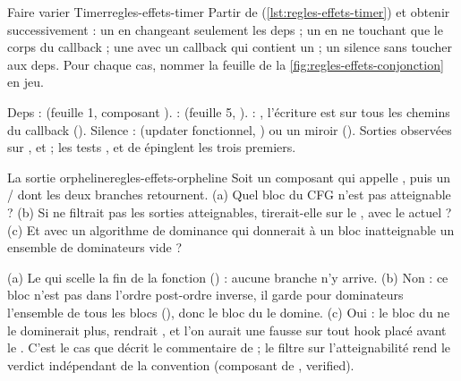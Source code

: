 \begin{exercice}{Faire varier Timer}{regles-effets-timer}
Partir de  (\cref{lst:regles-effets-timer}) et obtenir successivement : un \Warning{} en changeant seulement les deps ; un \Warning{} en ne touchant que le corps du callback ; une \Error{} avec un callback qui contient un  ; un silence sans toucher aux deps. Pour chaque cas, nommer la feuille de la \cref{fig:regles-effets-conjonction} en jeu.
\end{exercice}
\begin{solution}
Deps \code{[mode]} : \Warning{} (feuille 1, composant ).  : \Warning{} (feuille 5, ).  : \Error{}, l'écriture est sur tous les chemins du callback (). Silence :  (updater fonctionnel, ) ou un miroir  (). Sorties observées sur ,  et  ; les tests ,  et  de  épinglent les trois premiers.
\end{solution}

\begin{exercice}{La sortie orpheline}{regles-effets-orpheline}
Soit un composant qui appelle , puis un / dont les deux branches retournent. (a) Quel bloc  du CFG n'est pas atteignable ? (b) Si  ne filtrait pas les sorties atteignables,  tirerait-elle sur le , avec le  actuel ? (c) Et avec un algorithme de dominance qui donnerait à un bloc inatteignable un ensemble de dominateurs vide ?
\end{exercice}
\begin{solution}
(a) Le  qui scelle la fin de la fonction () : aucune branche n'y arrive. (b) Non : ce bloc n'est pas dans l'ordre post-ordre inverse, il garde pour dominateurs l'ensemble de tous les blocs (), donc le bloc du  le domine. (c) Oui : le bloc du  ne le dominerait plus,  rendrait , et l'on aurait une \Error{} fausse sur tout hook placé avant le . C'est le cas que décrit le commentaire de  ; le filtre sur l'atteignabilité rend le verdict indépendant de la convention (composant  de , \og verified\fg{}).
\end{solution}


